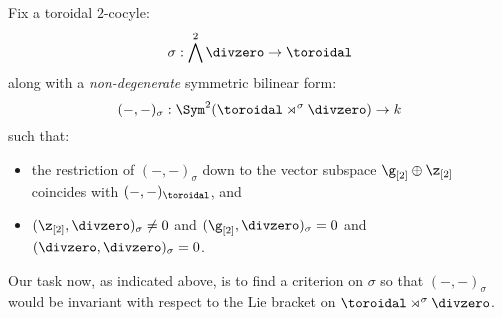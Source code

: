         Fix a toroidal $2$-cocyle:
            $$\sigma: \bigwedge^2 \divzero \to \toroidal$$
        along with a \textit{non-degenerate} symmetric bilinear form:
            $$(-, -)_{\sigma}: \Sym^2( \toroidal \rtimes^{\sigma} \divzero ) \to k$$
        such that:
        \begin{itemize}
            \item the restriction of $(-, -)_{\sigma}$ down to the vector subspace $\g_{[2]} \oplus \z_{[2]}$ coincides with $(-, -)_{\toroidal}$, and
            \item $(\z_{[2]}, \divzero)_{\sigma} \not = 0$ and $(\g_{[2]}, \divzero)_{\sigma} = 0$ and $(\divzero, \divzero)_{\sigma} = 0$.
        \end{itemize}
        Our task now, as indicated above, is to find a criterion on $\sigma$ so that $(-, -)_{\sigma}$ would be invariant with respect to the Lie bracket on $\toroidal \rtimes^{\sigma} \divzero$.
        
